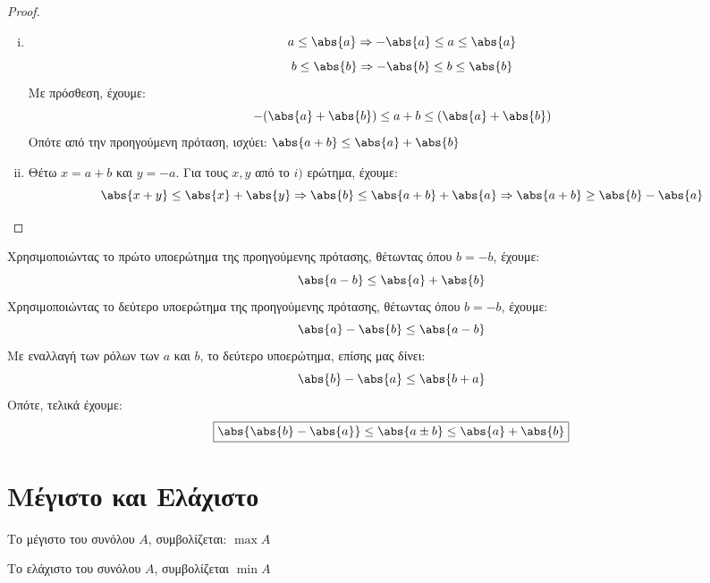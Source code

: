\documentclass[main.tex]{subfiles}
\begin{document}
\begin{proof}
\item {}
    \begin{enumerate}[i)]
        \item \[ a \leq \abs{a} \Rightarrow - \abs{a} \leq a \leq \abs{a}
            \] 
            \[
                b \leq \abs{b} \Rightarrow - \abs{b} \leq b \leq \abs{b} 
            \] 
            Με πρόσθεση, έχουμε: 
            \[
                - (\abs{a} + \abs{b} ) \leq a + b \leq ( \abs{a} + \abs{b}) 
            \] 
            Οπότε από την προηγούμενη πρόταση, ισχύει:
            $ \abs{a+b} \leq \abs{a} + \abs{b} $
        \item Θέτω $ x = a+b $ και $ y = -a $. Για τους $ x,y $ από το $ i) $ 
            ερώτημα, έχουμε:
            \[
                \abs{x+y} \leq \abs{x} + \abs{y} \Rightarrow \abs{b} \leq 
                \abs{a+b} + \abs{a} \Rightarrow \abs{a+b} \geq \abs{b} - \abs{a}
            \] 
    \end{enumerate} 
\end{proof} 

\begin{rem}
    Χρησιμοποιώντας το πρώτο υποερώτημα της προηγούμενης πρότασης, θέτωντας
    όπου $ b = -b $, έχουμε:
    \[
        \abs{a-b} \leq \abs{a} + \abs{b} 
    \] 
    Χρησιμοποιώντας το δεύτερο υποερώτημα της προηγούμενης πρότασης, θέτωντας
    όπου $ b = -b $, έχουμε:
    \[
        \abs{a} - \abs{b} \leq \abs{a-b} 
    \]
    Με εναλλαγή των ρόλων των $ a $ και $ b $, το δεύτερο υποερώτημα, επίσης 
    μας δίνει:
    \[
        \abs{b} - \abs{a} \leq \abs{b+a} 
    \] 
    Οπότε, τελικά έχουμε:
    \[
        \boxed{\abs{\abs{b} - \abs{a}} \leq \abs{a \pm b} \leq \abs{a} + \abs{b}  }
    \]
\end{rem}

\section{Μέγιστο και Ελάχιστο}


\begin{rem}
\item {}
    \begin{myitemize}
        \item Το μέγιστο του συνόλου $A$, συμβολίζεται: $ \max A $
        \item Το ελάχιστο του συνόλου $A$, συμβολίζεται $ \min A $
    \end{myitemize}
\end{rem}
\end{document}
